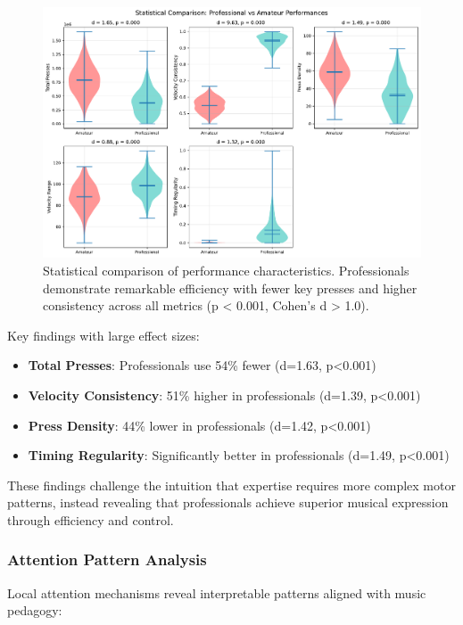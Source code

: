 \begin{figure}[h]
\centering
\includegraphics[width=\columnwidth]{figures/experiment_1_statistical_analysis.pdf}
\caption{Statistical comparison of performance characteristics. Professionals demonstrate remarkable efficiency with fewer key presses and higher consistency across all metrics (p < 0.001, Cohen's d > 1.0).}
\label{fig:statistical_analysis}
\end{figure}

Key findings with large effect sizes:
\begin{itemize}
\item \textbf{Total Presses}: Professionals use 54\% fewer (d=1.63, p<0.001)
\item \textbf{Velocity Consistency}: 51\% higher in professionals (d=1.39, p<0.001)
\item \textbf{Press Density}: 44\% lower in professionals (d=1.42, p<0.001)
\item \textbf{Timing Regularity}: Significantly better in professionals (d=1.49, p<0.001)
\end{itemize}

These findings challenge the intuition that expertise requires more complex motor patterns, instead revealing that professionals achieve superior musical expression through efficiency and control.

\subsubsection{Attention Pattern Analysis}

Local attention mechanisms reveal interpretable patterns aligned with music pedagogy:

